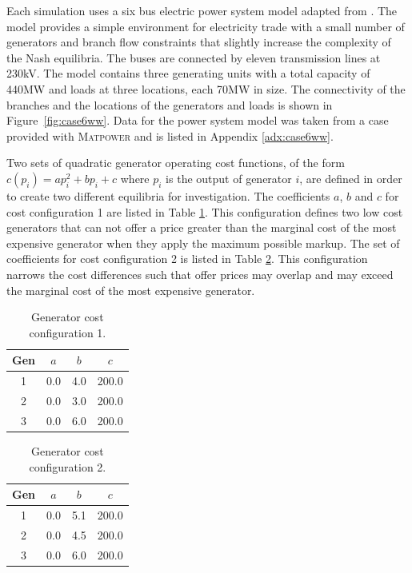 Each simulation uses a six bus electric power system model adapted from
.  The model provides a simple
environment for electricity trade with a small number of generators and branch
flow constraints that slightly increase the complexity of the Nash equilibria.
The buses are connected by eleven transmission lines at 230kV. The model
contains three generating units with a total capacity of 440MW and loads at
three locations, each 70MW in size. The connectivity of the branches and the
locations of the generators and loads is shown in Figure~\ref{fig:case6ww}. Data
for the power system model was taken from a case provided with \textsc{Matpower}
and is listed in Appendix \ref{adx:case6ww}.

Two sets of quadratic generator operating cost functions, of the form
$c(p_i)=ap_i^2+bp_i+c$ where $p_i$ is the output of generator $i$, are defined
in order to create two different equilibria for investigation.  The coefficients
$a$, $b$ and $c$ for cost configuration 1 are listed in Table
\ref{tbl:case6ww_gencost1}.  This configuration defines two low cost
generators that can not offer a price greater than the marginal cost of the most
expensive generator when they apply the maximum possible markup. The set of
coefficients for cost configuration 2 is listed in Table
\ref{tbl:case6ww_gencost2}.  This configuration narrows the cost differences
such that offer prices may overlap and may exceed the marginal cost of the most
expensive generator.


\begin{table}
\caption{Generator cost configuration 1.}
\label{tbl:case6ww_gencost1}
\begin{center}
\begin{tabular}{c|c|c|c}
\hline
Gen &$a$ &$b$ &$c$ \\
\hline\hline
 1 &0.0 &4.0 &200.0 \\
 2 &0.0 &3.0 &200.0 \\
 3 &0.0 &6.0 &200.0 \\
\hline
\end{tabular}
\end{center}
\end{table}

\begin{table}
\caption{Generator cost configuration 2.}
\label{tbl:case6ww_gencost2}
\begin{center}
\begin{tabular}{c|c|c|c}
\hline
Gen &$a$ &$b$ &$c$ \\
\hline\hline
 1 &0.0 &5.1 &200.0 \\
 2 &0.0 &4.5 &200.0 \\
 3 &0.0 &6.0 &200.0 \\
\hline
\end{tabular}
\end{center}
\end{table}

